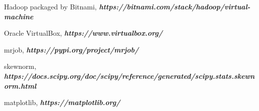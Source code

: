\documentclass[11pt]{article}
\begin{document}
	\newpage
	\begin{thebibliography}{1}
		Hadoop packaged by Bitnami, \textit{\textbf{https://bitnami.com/stack/hadoop/virtual-machine}}
	
	
		Oracle VirtualBox, \textit{\textbf{https://www.virtualbox.org/}}

		
		mrjob, \textit{\textbf{https://pypi.org/project/mrjob/}}
		
		skewnorm, \textit{\textbf{https://docs.scipy.org/doc/scipy/reference/generated/scipy.stats.skewnorm.html}}
		
		matplotlib, \textit{\textbf{https://matplotlib.org/}}
		
		
		
	\end{thebibliography}
	
	
\end{document}
